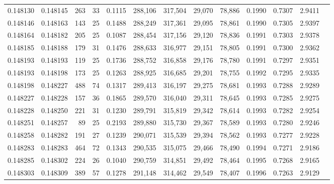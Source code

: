 \begin{tabular}{rrrrrrrrrrrrr}
0.148130 & 0.148145 &   263 &  33 &                                     0.1115 & 288,106 & 317,504 &  29,070 &  78,886 & 0.1990 & 0.7307 & 2.9411 \\
0.148146 & 0.148163 &   143 &  25 &                                     0.1488 & 288,249 & 317,361 &  29,095 &  78,861 & 0.1990 & 0.7305 & 2.9397 \\
0.148164 & 0.148182 &   205 &  25 &                                     0.1087 & 288,454 & 317,156 &  29,120 &  78,836 & 0.1991 & 0.7303 & 2.9378 \\
0.148185 & 0.148188 &   179 &  31 &                                     0.1476 & 288,633 & 316,977 &  29,151 &  78,805 & 0.1991 & 0.7300 & 2.9362 \\
0.148193 & 0.148193 &   119 &  25 &                                     0.1736 & 288,752 & 316,858 &  29,176 &  78,780 & 0.1991 & 0.7297 & 2.9351 \\
0.148193 & 0.148198 &   173 &  25 &                                     0.1263 & 288,925 & 316,685 &  29,201 &  78,755 & 0.1992 & 0.7295 & 2.9335 \\
0.148198 & 0.148227 &   488 &  74 &                                     0.1317 & 289,413 & 316,197 &  29,275 &  78,681 & 0.1993 & 0.7288 & 2.9289 \\
0.148227 & 0.148228 &   157 &  36 &                                     0.1865 & 289,570 & 316,040 &  29,311 &  78,645 & 0.1993 & 0.7285 & 2.9275 \\
0.148228 & 0.148250 &   221 &  31 &                                     0.1230 & 289,791 & 315,819 &  29,342 &  78,614 & 0.1993 & 0.7282 & 2.9254 \\
0.148251 & 0.148257 &    89 &  25 &                                     0.2193 & 289,880 & 315,730 &  29,367 &  78,589 & 0.1993 & 0.7280 & 2.9246 \\
0.148258 & 0.148282 &   191 &  27 &                                     0.1239 & 290,071 & 315,539 &  29,394 &  78,562 & 0.1993 & 0.7277 & 2.9228 \\
0.148283 & 0.148283 &   464 &  72 &                                     0.1343 & 290,535 & 315,075 &  29,466 &  78,490 & 0.1994 & 0.7271 & 2.9186 \\
0.148285 & 0.148302 &   224 &  26 &                                     0.1040 & 290,759 & 314,851 &  29,492 &  78,464 & 0.1995 & 0.7268 & 2.9165 \\
0.148303 & 0.148309 &   389 &  57 &                                     0.1278 & 291,148 & 314,462 &  29,549 &  78,407 & 0.1996 & 0.7263 & 2.9129 \\

\end{tabular}

